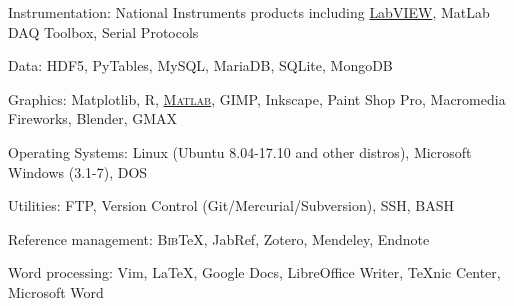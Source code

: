 \documentclass[10pt]{article}
\newenvironment{innerlist}[1][\enskip\textbullet]%
        {\begin{compactitem}[#1]}{\end{compactitem}}
\newcommand{\blankline}{\quad\pagebreak[2]}
\begin{document}
\begin{innerlist}
\blankline

Instrumentation: National Instruments products including
\href{http://www.ni.com/}{LabVIEW}, MatLab DAQ Toolbox, Serial Protocols

\blankline

Data: HDF5, PyTables, MySQL, MariaDB, SQLite, MongoDB

\blankline

Graphics: Matplotlib, R,
\href{http://www.mathworks.com/products/matlab/}{\textsc{Matlab}}, GIMP,
Inkscape, Paint Shop Pro, Macromedia Fireworks, Blender, GMAX

\blankline

Operating Systems: Linux (Ubuntu 8.04-17.10 and other distros), Microsoft
Windows (3.1-7), DOS

\blankline

Utilities: FTP, Version Control (Git/Mercurial/Subversion), SSH, BASH

\blankline

Reference management: B\textsc{ib}\TeX{}, JabRef, Zotero, Mendeley, Endnote

\blankline

Word processing: Vim, \LaTeX{}, Google Docs, LibreOffice Writer, TeXnic Center,
Microsoft Word


\end{innerlist}
\end{document}
